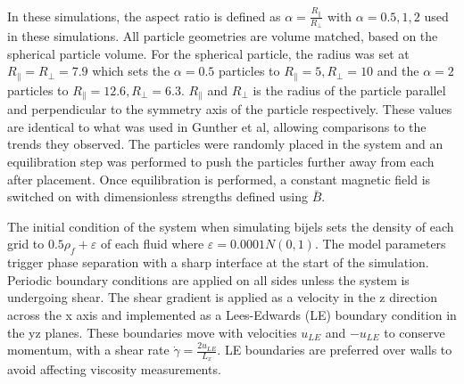 In these simulations, the aspect ratio is defined as $\alpha = \frac{R_{\parallel}}{R_{\perp}}$ with $\alpha = 0.5, 1, 2$ 
used in these simulations. All particle geometries are volume matched, based on the spherical particle volume. For the 
spherical particle, the radius was set at $R_{\parallel} = R_{\perp} = 7.9$ which sets the $\alpha = 0.5$ particles to 
$R_{\parallel} = 5, R_{\perp} = 10$ and the $\alpha = 2$ particles to $R_{\parallel} = 12.6, R_{\perp} = 6.3$. 
$R_{\parallel}$ and $R_{\perp}$ is the radius of the particle parallel and perpendicular to the symmetry axis of 
the particle respectively. These values are identical to what was used in Gunther et al, allowing comparisons to the 
trends they observed. \cite{gunther_timescales_2014} The particles were randomly placed in the system and an equilibration
step was performed to push the particles further away from each after placement. Once equilibration is performed, a 
constant magnetic field is switched on with dimensionless strengths defined using $\bar{B}$.

The initial condition of the system when simulating bijels sets the density of each grid to $0.5\rho_f + \varepsilon$ of 
each fluid where $\varepsilon = 0.0001N(0,1)$. The model parameters trigger phase separation with a sharp interface at 
the start of the simulation. Periodic boundary conditions are applied on all sides unless the system is undergoing shear. 
The shear gradient is applied as a velocity in the z direction across the x axis and implemented as a Lees-Edwards 
(LE) boundary condition in the yz planes. \cite{wagner_leesedwards_2002, lorenz_lees-edwards_2009, yang_capillary_2022} 
These boundaries move with velocities $u_{LE}$ and $-u_{LE}$ to conserve momentum, with a shear rate 
$\dot{\gamma} = \frac{2 u_{LE}}{L_x}$. LE boundaries are preferred over walls to avoid affecting viscosity measurements. 
\cite{wagner_leesedwards_2002, lorenz_lees-edwards_2009, yang_capillary_2022}

